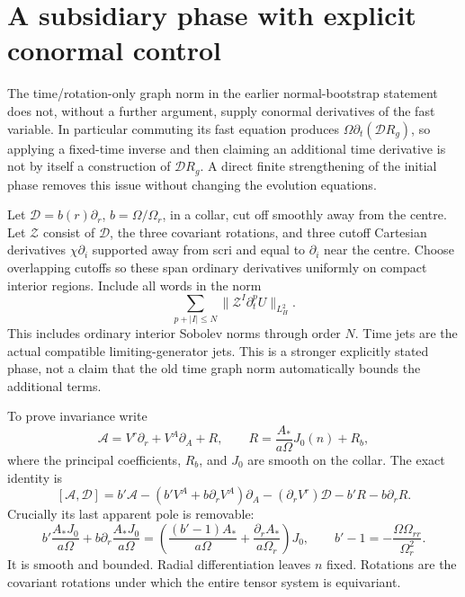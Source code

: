 \section{A subsidiary phase with explicit conormal control}
\label{sec:subsidiary-conormal-phase-audit}

The time/rotation-only graph norm in the earlier normal-bootstrap statement
does not, without a further argument, supply conormal derivatives of the
fast variable.  In particular commuting its fast equation produces
$\Omega\partial_t(\mathcal D R_g)$, so applying a fixed-time inverse and
then claiming an additional time derivative is not by itself a construction
of $\mathcal D R_g$.  A direct finite strengthening of the initial phase
removes this issue without changing the evolution equations.

Let $\mathcal D=b(r)\partial_r$, $b=\Omega/\Omega_r$, in a collar, cut off
smoothly away from the centre.  Let $\mathcal Z$ consist of $\mathcal D$,
the three covariant rotations, and three cutoff Cartesian derivatives
$\chi\partial_i$ supported away from scri and equal to $\partial_i$ near
the centre.  Choose overlapping cutoffs so these span ordinary derivatives
uniformly on compact interior regions.  Include all words in the norm
\[
 \sum_{p+|I|\le N}
 \|\mathcal Z^I\partial_t^pU\|_{L^2_H}.
\]
This includes ordinary interior Sobolev norms through order $N$.
Time jets are the actual compatible limiting-generator jets.  This is a
stronger explicitly stated phase, not a claim that the old time graph norm
automatically bounds the additional terms.

To prove invariance write
\[
 \mathcal A=V^r\partial_r+V^A\partial_A+R,
 \qquad R=\frac{A_*}{a\Omega}J_0(n)+R_b,
\]
where the principal coefficients, $R_b$, and $J_0$ are smooth on the collar.
The exact identity is
\[
 [\mathcal A,\mathcal D]
 =b'\mathcal A-(b'V^A+b\partial_rV^A)\partial_A
  -(\partial_rV^r)\mathcal D-b'R-b\partial_rR.
\]
Crucially its last apparent pole is removable:
\[
 b'\frac{A_*J_0}{a\Omega}
 +b\partial_r\frac{A_*J_0}{a\Omega}
 =\left(\frac{(b'-1)A_*}{a\Omega}
       +\frac{\partial_rA_*}{a\Omega_r}\right)J_0,
 \qquad b'-1=-\frac{\Omega\Omega_{rr}}{\Omega_r^2}.
\]
It is smooth and bounded.  Radial differentiation leaves $n$ fixed.
Rotations are the covariant rotations under which the entire tensor system
is equivariant.

